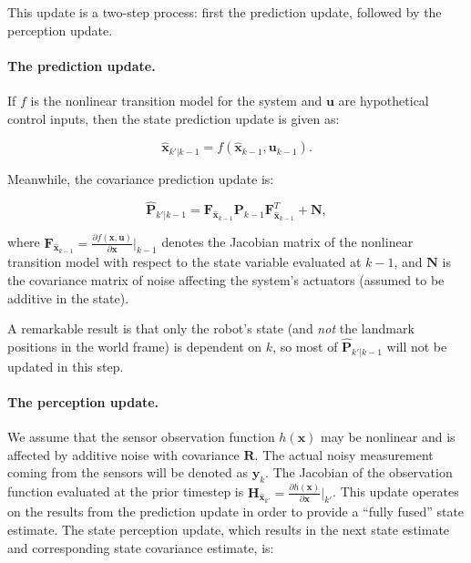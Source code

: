This update is a two-step process: first the prediction update, followed by the perception update.

\paragraph{The prediction update.} If $f$ is the nonlinear transition model for the system and $\boldsymbol{u}$ are hypothetical control inputs, then the state prediction update is given as:

\begin{equation}
    \hat{\boldsymbol{x}}_{k'|k-1}= f(\hat{\boldsymbol{x}}_{k-1},\boldsymbol{u}_{k-1}).
\end{equation}

Meanwhile, the covariance prediction update is:

\begin{equation}
    \hat{\boldsymbol{P}}_{k'|k-1} = \boldsymbol{F}_{\hat{\boldsymbol{x}}_{k-1}} \boldsymbol{P}_{k-1} \boldsymbol{F}_{\hat{\boldsymbol{x}}_{k-1}}^T + \boldsymbol{N},
\end{equation}

\noindent where $\boldsymbol{F}_{\hat{\boldsymbol{x}}_{k-1}} = \frac{\partial f(\boldsymbol{x},\boldsymbol{u})}{\partial \boldsymbol{x}}|_{k-1}$ denotes the Jacobian matrix of the nonlinear transition model with respect to the state variable evaluated at $k-1$, and $\boldsymbol{N}$ is the covariance matrix of noise affecting the system's actuators (assumed to be additive in the state).

A remarkable result is that only the robot's state (and \emph{not} the landmark positions in the world frame) is dependent on $k$, so most of $\hat{\boldsymbol{P}}_{k'|k-1}$ will not be updated in this step.

\paragraph{The perception update.} We assume that the sensor observation function $h(\boldsymbol{x})$ may be nonlinear and is affected by additive noise with covariance $\boldsymbol{R}$. The actual noisy measurement coming from the sensors will be denoted as $\boldsymbol{y}_{k}$. The Jacobian of the observation function evaluated at the prior timestep is $\boldsymbol{H}_{\hat{\boldsymbol{x}}_{k'}} = \frac{\partial h(\boldsymbol{x})}{\partial \boldsymbol{x}}|_{k'}$. This update operates on the results from the prediction update in order to provide a ``fully fused'' state estimate. The state perception update, which results in the next state estimate and corresponding state covariance estimate, is:

